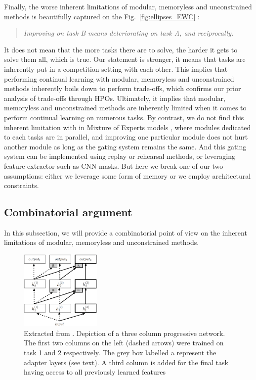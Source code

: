 \documentclass[11pt]{article}
\begin{document}
\vspace{2mm}
\noindent
Finally, the worse inherent limitations of modular, memoryless and unconstrained methods is beautifully captured on the Fig.~\ref{fig:ellipses_EWC} :
\begin{quote}
    \itshape
    \centering
    Improving on task B means deteriorating on task A, and reciprocally.
\end{quote}
\vspace{2mm}
\noindent
It does not mean that the more tasks there are to solve, the harder it gets to solve them all, which is true. Our statement is stronger, it means that tasks are inherently put in a competition setting with each other. This implies that performing continual learning with modular, memoryless and unconstrained methods inherently boils down to perform trade-offs, which confirms our prior analysis of trade-offs through HPOs. Ultimately, it implies that modular, memoryless and unconstrained methods are inherently limited when it comes to perform continual learning on numerous tasks. By contrast, we do not find this inherent limitation with in Mixture of Experts models \cite{moe_1}\cite{moe_2}, where modules dedicated to each tasks are in parallel, and improving one particular module does not hurt another module as long as the gating system remains the same. And this gating system can be implemented using replay or rehearsal methods, or leveraging feature extractor such as CNN masks. But here we break one of our two assumptions: either we leverage some form of memory or we employ architectural constraints.


\subsection{Combinatorial argument}


In this subsection, we will provide a combinatorial point of view on the inherent limitations of modular, memoryless and unconstrained methods.

\begin{figure}
    \centering
    \includegraphics[width=0.35\textwidth]{images/PNN.png}
    \caption{Extracted from \cite{PNN}. Depiction of a three column progressive network. The first two columns on the left (dashed arrows) were trained on task 1 and 2 respectively. The grey box labelled a represent the adapter layers (see text). A third column is added for the final task having access to all previously learned features}
    \label{fig:PNN}
\end{figure}
\end{document}
